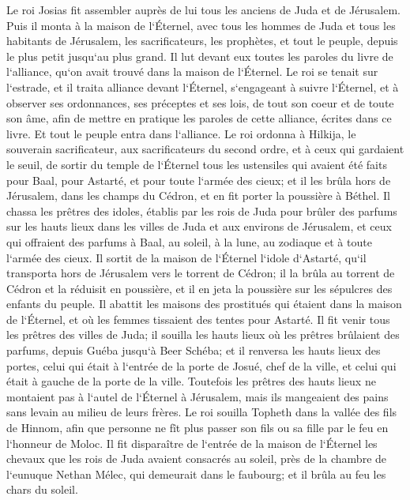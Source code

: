 \verse Le roi Josias fit assembler auprès de lui tous les anciens de Juda et de Jérusalem. 
\verse Puis il monta à la maison de l`Éternel, avec tous les hommes de Juda et tous les habitants de Jérusalem, les sacrificateurs, les prophètes, et tout le peuple, depuis le plus petit jusqu`au plus grand. Il lut devant eux toutes les paroles du livre de l`alliance, qu`on avait trouvé dans la maison de l`Éternel. 
\verse Le roi se tenait sur l`estrade, et il traita alliance devant l`Éternel, s`engageant à suivre l`Éternel, et à observer ses ordonnances, ses préceptes et ses lois, de tout son coeur et de toute son âme, afin de mettre en pratique les paroles de cette alliance, écrites dans ce livre. Et tout le peuple entra dans l`alliance. 
\verse Le roi ordonna à Hilkija, le souverain sacrificateur, aux sacrificateurs du second ordre, et à ceux qui gardaient le seuil, de sortir du temple de l`Éternel tous les ustensiles qui avaient été faits pour Baal, pour Astarté, et pour toute l`armée des cieux; et il les brûla hors de Jérusalem, dans les champs du Cédron, et en fit porter la poussière à Béthel. 
\verse Il chassa les prêtres des idoles, établis par les rois de Juda pour brûler des parfums sur les hauts lieux dans les villes de Juda et aux environs de Jérusalem, et ceux qui offraient des parfums à Baal, au soleil, à la lune, au zodiaque et à toute l`armée des cieux. 
\verse Il sortit de la maison de l`Éternel l`idole d`Astarté, qu`il transporta hors de Jérusalem vers le torrent de Cédron; il la brûla au torrent de Cédron et la réduisit en poussière, et il en jeta la poussière sur les sépulcres des enfants du peuple. 
\verse Il abattit les maisons des prostitués qui étaient dans la maison de l`Éternel, et où les femmes tissaient des tentes pour Astarté. 
\verse Il fit venir tous les prêtres des villes de Juda; il souilla les hauts lieux où les prêtres brûlaient des parfums, depuis Guéba jusqu`à Beer Schéba; et il renversa les hauts lieux des portes, celui qui était à l`entrée de la porte de Josué, chef de la ville, et celui qui était à gauche de la porte de la ville. 
\verse Toutefois les prêtres des hauts lieux ne montaient pas à l`autel de l`Éternel à Jérusalem, mais ils mangeaient des pains sans levain au milieu de leurs frères. 
\verse Le roi souilla Topheth dans la vallée des fils de Hinnom, afin que personne ne fît plus passer son fils ou sa fille par le feu en l`honneur de Moloc. 
\verse Il fit disparaître de l`entrée de la maison de l`Éternel les chevaux que les rois de Juda avaient consacrés au soleil, près de la chambre de l`eunuque Nethan Mélec, qui demeurait dans le faubourg; et il brûla au feu les chars du soleil. 
